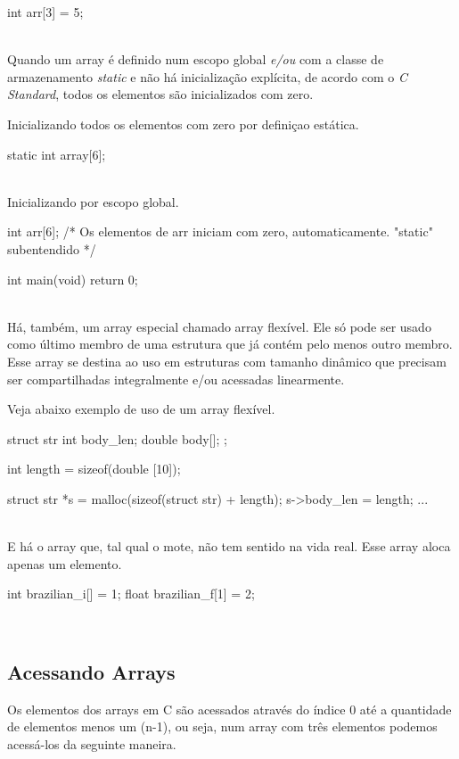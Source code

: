 \begin{ccode}
  int arr[3] = {5};
\end{ccode}
\\

Quando um array é definido num escopo global \textit{e/ou} com a classe de armazenamento \textit{static} e não há inicialização explícita, de acordo com o \textit{C Standard}, todos os elementos são inicializados com zero.

Inicializando todos os elementos com zero por definiçao estática.

\begin{ccode}
  static int array[6];
\end{ccode}
\\

Inicializando por escopo global.

\begin{ccode}
  int arr[6];  /* Os elementos de arr iniciam
                  com zero, automaticamente.
                  "static" subentendido */

  int main(void)
  {
    return 0;
  }
\end{ccode}
\\

Há, também, um array especial chamado array flexível. Ele só pode ser usado como último membro de uma estrutura que já contém pelo menos outro membro. Esse array se destina ao uso em estruturas com tamanho dinâmico que precisam ser compartilhadas integralmente e/ou acessadas linearmente.

Veja abaixo exemplo de uso de um array flexível.

\begin{ccode}
  struct str {
      int body_len;
      double body[];
  };

  int length = sizeof(double [10]);

  struct str *s = malloc(sizeof(struct str) + length);
  s->body_len = length;
  ...
\end{ccode}
\\

E há o array  que, tal qual o mote, não tem sentido na vida real. Esse array aloca apenas um elemento.

\begin{ccode}
  int brazilian_i[] = {1};
  float brazilian_f[1] = {2};
\end{ccode}
\\

\subsection{Acessando Arrays}
Os elementos dos arrays em C são acessados através do índice 0 até a quantidade de elementos menos um (n-1), ou seja, num array com três elementos podemos acessá-los da seguinte maneira.

